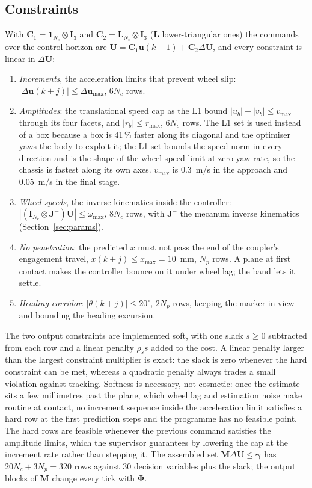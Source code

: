\documentclass[11pt,a4paper]{article}
\newcommand{\vect}[1]{\bm{#1}}
\newcommand{\mat}[1]{\bm{#1}}
\newcommand{\dU}{\Delta\vect{U}}
\newcommand{\du}{\Delta\vect{u}}
\newcommand{\Np}{N_p}
\newcommand{\Nc}{N_c}
\newcommand{\ones}{\vect{1}}
\begin{document}
\subsection{Constraints}
With $\mat C_1 = \ones_{\Nc}\otimes\mat I_3$ and $\mat C_2 = \mat L_{\Nc}\otimes\mat I_3$ ($\mat L$ lower-triangular ones) the commands over the control horizon are $\vect U = \mat C_1\vect u(k-1) + \mat C_2\dU$, and every constraint is linear in $\dU$:
\begin{enumerate}
\item \emph{Increments}, the acceleration limits that prevent wheel slip: $|\du(k+j)|\le\Delta\vect u_{\max}$, $6\Nc$ rows.
\item \emph{Amplitudes}: the translational speed cap as the L1 bound $|u_b|+|v_b|\le v_{\max}$ through its four facets, and $|r_b|\le r_{\max}$, $6\Nc$ rows. The L1 set is used instead of a box because a box is 41\,\% faster along its diagonal and the optimiser yaws the body to exploit it; the L1 set bounds the speed norm in every direction and is the shape of the wheel-speed limit at zero yaw rate, so the chassis is fastest along its own axes. $v_{\max}$ is 0.3~m/s in the approach and 0.05~m/s in the final stage.
\item \emph{Wheel speeds}, the inverse kinematics inside the controller: $|(\mat I_{\Nc}\otimes\mat J^{-})\vect U|\le\omega_{\max}$, $8\Nc$ rows, with $\mat J^{-}$ the mecanum inverse kinematics (Section~\ref{sec:params}).
\item \emph{No penetration}: the predicted $x$ must not pass the end of the coupler's engagement travel, $x(k+j)\le x_{\max} = 10$~mm, $\Np$ rows. A plane at first contact makes the controller bounce on it under wheel lag; the band lets it settle.
\item \emph{Heading corridor}: $|\theta(k+j)|\le 20^\circ$, $2\Np$ rows, keeping the marker in view and bounding the heading excursion.
\end{enumerate}
The two output constraints are implemented soft, with one slack $s\ge 0$ subtracted from each row and a linear penalty $\rho_s s$ added to the cost. A linear penalty larger than the largest constraint multiplier is exact: the slack is zero whenever the hard constraint can be met, whereas a quadratic penalty always trades a small violation against tracking. Softness is necessary, not cosmetic: once the estimate sits a few millimetres past the plane, which wheel lag and estimation noise make routine at contact, no increment sequence inside the acceleration limit satisfies a hard row at the first prediction steps and the programme has no feasible point. The hard rows are feasible whenever the previous command satisfies the amplitude limits, which the supervisor guarantees by lowering the cap at the increment rate rather than stepping it. The assembled set $\mat M\dU\le\vect\gamma$ has $20\Nc + 3\Np = 320$ rows against 30 decision variables plus the slack; the output blocks of $\mat M$ change every tick with $\mat\Phi$.
\end{document}
